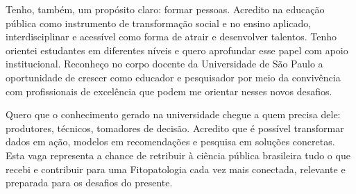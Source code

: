 \documentclass[12pt,a4paper,oneside]{book}
\newcommand{\USP}{Universidade de São Paulo}
\begin{document}
Tenho, também, um propósito claro: formar pessoas. Acredito na educação pública como instrumento de 
transformação social e no ensino aplicado, interdisciplinar e acessível como forma de atrair e 
desenvolver talentos. Tenho orientei estudantes em diferentes níveis e quero aprofundar esse
papel com apoio institucional. Reconheço no corpo docente da \USP{} a oportunidade de crescer como educador e 
pesquisador por meio da convivência com profissionais de excelência que podem me orientar nesses novos desafios.

Quero que o conhecimento gerado na universidade chegue a quem precisa dele: produtores, técnicos, tomadores de 
decisão. Acredito que é possível transformar dados em ação, modelos em recomendações e pesquisa em soluções 
concretas. Esta vaga representa a chance de retribuir à ciência pública brasileira tudo o que recebi e 
contribuir para uma Fitopatologia cada vez mais conectada, relevante e preparada para os desafios do presente.

\backmatter


\end{document}

